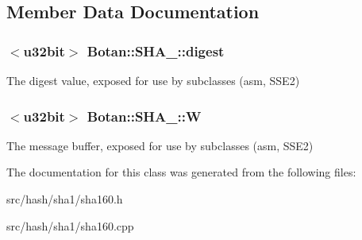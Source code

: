 \subsection{Member Data Documentation}
\hypertarget{classBotan_1_1SHA__160_a839026853038eb4c05808907bcdb00cf}{
\subsubsection[{digest}]{$<${\bf u32bit}$>$ Botan\-::\-S\-H\-A\-\_\-::digest\hspace{0.3cm}{\ttfamily [protected]}}}\label{classBotan_1_1SHA__160_a839026853038eb4c05808907bcdb00cf}
The digest value, exposed for use by subclasses (asm, S\-S\-E2) \hypertarget{classBotan_1_1SHA__160_a65ca83685049a564d97f22ac80dcc007}{
\subsubsection[{W}]{$<${\bf u32bit}$>$ Botan\-::\-S\-H\-A\-\_\-::\-W\hspace{0.3cm}{\ttfamily [protected]}}}\label{classBotan_1_1SHA__160_a65ca83685049a564d97f22ac80dcc007}
The message buffer, exposed for use by subclasses (asm, S\-S\-E2) 

The documentation for this class was generated from the following files\-:\begin{DoxyCompactItemize}
\item 
src/hash/sha1/sha160.\-h\item 
src/hash/sha1/sha160.\-cpp\end{DoxyCompactItemize}
